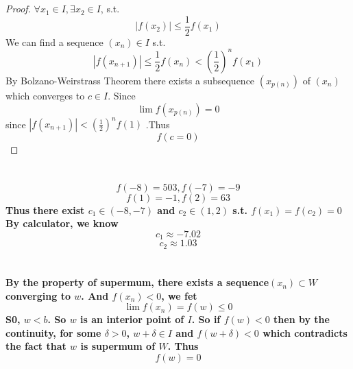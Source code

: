 \documentclass{article}
\begin{document}
    \section{}
        \begin{proof}
            $\forall x_1\in I, \exists x_2\in I$, s.t.
            $$|f(x_2)|  \leq \frac{1}{2}f(x_1)$$
            We can find a sequence $(x_n)\in I$ s.t.
            $$|f(x_{n+1})|  \leq \frac{1}{2}f(x_n)<(\frac 1 2)^nf(x_1)$$ 
            By Bolzano-Weirstrass Theorem there exists a subsequence $(x_{p(n)})$ of $(x_n)$ which converges to $c\in I$. Since 
            $$\lim f(x_{p(n)})=0$$ since $|f(x_{n+1})|<(\frac{1}{2})^nf(1)$
            .Thus
            $$f(c=0)$$
        \end{proof}

    \section{}
        \paragraph{
            $$f(-8)=503,f(-7)=-9$$
            $$f(1)=-1,f(2)=63$$
            Thus there exist $c_1\in (-8,-7)$ and $c_2\in (1,2)$ s.t.
            $f(x_1)=f(c_2)=0$
            By calculator, we know $$c_1\approx -7.02$$
            $$c_2\approx 1.03$$
            }
    \section{}
        \paragraph{
            By the property of supermum, there exists a sequence$(x_n)\subset W$ converging to $w$. And $f(x_n)<0$,
            we fet $$\lim f(x_n)=f(w)\leq 0$$
            S0, $w<b$. So $w$ is an interior point of $I$. So if $f(w)<0$ then by the continuity, for some $\delta>0$, $w+\delta\in I$ and $f(w+\delta)<0$ which contradicts the fact that $w$ is supermum of $W$. Thus $$f(w)=0$$ 
        }
\end{document}
